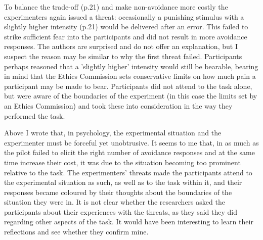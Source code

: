\documentclass[a4paper]{article}
\begin{document}
To {\textquotedbl}balance the trade-off{\textquotedbl} (p.21) and make non-avoidance more costly the experimenters again issued a threat: occasionally a punishing stimulus with {\textquotedbl}a slightly higher intensity{\textquotedbl} (p.21) would be delivered after an error. This failed to strike sufficient fear into the participants and did not result in more avoidance responses. The authors are surprised and do not offer an explanation, but I suspect the reason may be similar to why the first threat failed. Participants perhaps reasoned that a 'slightly higher' intensity would still be bearable, bearing in mind that the Ethics Commission sets conservative limits on how much pain a participant may be made to bear. Participants did not attend to the task alone, but were aware of the boundaries of the experiment (in this case the limits set by an Ethics Commission) and took these into consideration in the way they performed the task.

Above I wrote that, in psychology, the experimental situation and the experimenter must be forceful yet unobtrusive. It seems to me that, in as much as the pilot failed to elicit the right number of avoidance responses and at the same time increase their cost, it was due to the situation becoming too prominent relative to the task. The experimenters' threats made the participants attend to the experimental situation as such, as well as to the task within it, and their responses became coloured by their thoughts about the boundaries of the situation they were in. It is not clear whether the researchers asked the participants about their experiences with the threats, as they said they did regarding other aspects of the task. It would have been interesting to learn their reflections and see whether they confirm mine.
\end{document}
